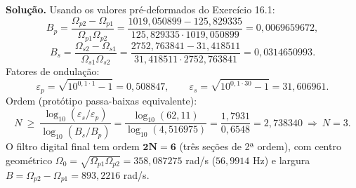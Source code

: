 \textbf{Solução.} Usando os valores pré-deformados do Exercício 16.1:
\[
  B_p=\frac{\Omega_{p2}-\Omega_{p1}}{\Omega_{p1}\Omega_{p2}}
      =\frac{1019{,}050899-125{,}829335}{125{,}829335\cdot1019{,}050899}
      =0{,}0069659672,
\]
\[
  B_s=\frac{\Omega_{s2}-\Omega_{s1}}{\Omega_{s1}\Omega_{s2}}
      =\frac{2752{,}763841-31{,}418511}{31{,}418511\cdot2752{,}763841}
      =0{,}0314650993 .
\]
Fatores de ondulação:
\[
  \varepsilon_p=\sqrt{10^{0{,}1\cdot1}-1}=0{,}508847,\qquad
  \varepsilon_s=\sqrt{10^{0{,}1\cdot30}-1}=31{,}606961 .
\]
Ordem (protótipo passa-baixas equivalente):
\[
  N\ \ge\
  \frac{\log_{10}(\varepsilon_s/\varepsilon_p)}
       {\log_{10}(B_s/B_p)}
  =\frac{\log_{10}(62{,}11)}{\log_{10}(4{,}516975)}
  =\frac{1{,}7931}{0{,}6548}=2{,}738340
  \ \Longrightarrow\ \boxed{N=3}.
\]
O filtro digital final tem ordem $\mathbf{2N=6}$ (três seções de 2ª ordem),
com centro geométrico $\Omega_0=\sqrt{\Omega_{p1}\Omega_{p2}}
=358{,}087275$ rad/s ($56{,}9914$ Hz) e largura $B=\Omega_{p2}-\Omega_{p1}
=893{,}2216$ rad/s.

